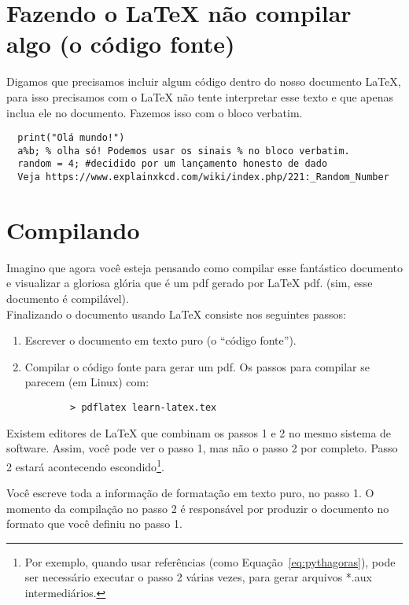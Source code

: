 \documentclass[12pt]{article}
\begin{document}
\section{Fazendo o \LaTeX{} não compilar algo (o código fonte)}
Digamos que precisamos incluir algum código dentro do nosso
documento \LaTeX{}, para isso precisamos com o \LaTeX{}
não tente interpretar esse texto e que apenas inclua ele no documento. Fazemos
isso com o bloco verbatim.

\begin{verbatim} 
  print("Olá mundo!")
  a%b; % olha só! Podemos usar os sinais % no bloco verbatim. 
  random = 4; #decidido por um lançamento honesto de dado
  Veja https://www.explainxkcd.com/wiki/index.php/221:_Random_Number
\end{verbatim}

\section{Compilando} 

Imagino que agora você esteja pensando como compilar esse fantástico documento
e visualizar a gloriosa glória que é um pdf gerado por \LaTeX{} pdf.
(sim, esse documento é compilável). \\

Finalizando o documento usando \LaTeX{} consiste nos seguintes passos:
  \begin{enumerate}
    \item Escrever o documento em texto puro (o ``código fonte'').
    \item Compilar o código fonte para gerar um pdf. 
     Os passos para compilar se parecem (em Linux) com: \\
     \begin{verbatim} 
        > pdflatex learn-latex.tex
     \end{verbatim}
  \end{enumerate}

Existem editores de \LaTeX{} que combinam os passos 1 e 2 no mesmo
sistema de software. Assim, você pode ver o passo 1, mas não o passo 2 por
completo. Passo 2 estará acontecendo escondido\footnote{Por exemplo, quando usar
referências (como Equação~\ref{eq:pythagoras}), pode ser necessário executar o
passo 2 várias vezes, para gerar arquivos *.aux intermediários.}.

Você escreve toda a informação de formatação em texto puro, no passo 1. O
momento da compilação no passo 2 é responsável por produzir o documento no
formato que você definiu no passo 1.
\end{document}
